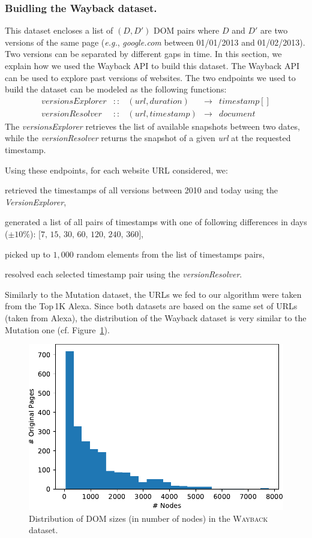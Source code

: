 \subsubsection{Buidling the {\sc Wayback} dataset.}\label{waybackDataset}
This dataset encloses a list of $(D, D')$ DOM pairs where $D$ and $D'$ are two versions of the same page (\emph{e.g.}, \textit{google.com} between 01/01/2013 and 01/02/2013).
Two versions can be separated by different gaps in time.
In this section, we explain how we used the Wayback API to build this dataset.
The Wayback API can be used to explore past versions of websites.
The two endpoints we used to build the dataset can be modeled as the following functions:
\begin{align*}
versionsExplorer &::& (url, duration)  & \to & timestamp[] \\
versionResolver  &::& (url, timestamp) & \to & document
\end{align*}
The \textit{versionsExplorer} retrieves the list of available snapshots between two dates, while the \textit{versionResolver} returns the snapshot of a given \textit{url} at the requested timestamp.

Using these endpoints, for each website URL considered, we:
\begin{compactenum}
\item retrieved the timestamps of all versions between 2010 and today using the \textit{VersionExplorer},
\item generated a list of all pairs of timestamps with one of following differences in days ($\pm 10\%$): $\text{[7, 15, 30, 60, 120, 240, 360]}$,
\item picked up to $1,000$ random elements from the list of timestamps pairs,
\item resolved each selected timestamp pair using the \textit{versionResolver}.
\end{compactenum}

Similarly to the {\sc Mutation} dataset, the URLs we fed to our algorithm were taken from the Top\,1K Alexa.
Since both datasets are based on the same set of URLs (taken from Alexa), the distribution of the {\sc Wayback} dataset is very similar to the {\sc Mutation} one (cf. Figure~\ref{fig:distribution_wayback}).

\begin{figure}[h]
  \centering
  \includegraphics[width=.8\linewidth]{erratum/distribution_wayback}
  \caption{Distribution of DOM sizes (in number of nodes) in the \textsc{Wayback} dataset.}
  \label{fig:distribution_wayback}
\end{figure}

